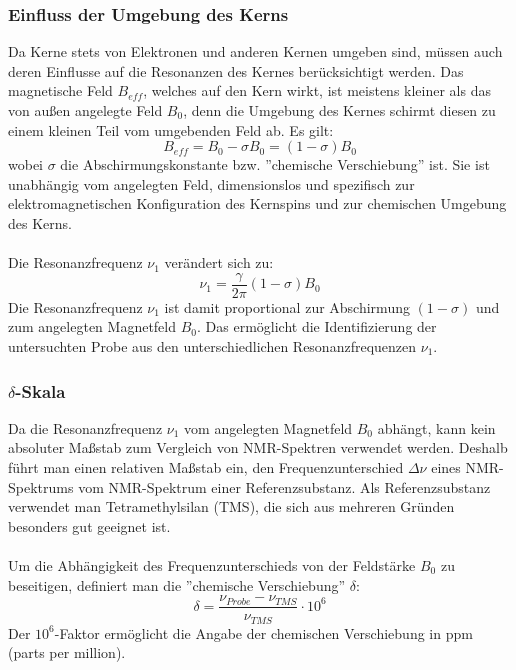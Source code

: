\documentclass[a4paper,titlepage]{scrartcl}
\numberwithin{equation}{section}
\begin{document}
\subsubsection{Einfluss der Umgebung des Kerns}
Da Kerne stets von Elektronen und anderen Kernen umgeben sind, müssen auch deren Einflusse auf die Resonanzen des Kernes berücksichtigt werden. Das magnetische Feld $B_{eff}$, welches auf den Kern wirkt, ist meistens kleiner als das von außen angelegte Feld $B_0$, denn die Umgebung des Kernes schirmt diesen zu einem kleinen Teil vom umgebenden Feld ab. Es gilt:
\begin{equation*}
B_{eff}=B_0-\sigma B_0=(1-\sigma)B_0
\end{equation*}
wobei $\sigma$ die Abschirmungskonstante bzw. ''chemische Verschiebung'' ist. Sie ist unabhängig vom angelegten Feld, dimensionslos und spezifisch zur elektromagnetischen Konfiguration des Kernspins und zur chemischen Umgebung des Kerns.\\ \\
Die Resonanzfrequenz $\nu_1$ verändert sich zu:
\begin{equation*}
\nu_1=\frac{\gamma}{2 \pi} (1 - \sigma) B_0
\end{equation*}
Die Resonanzfrequenz $\nu_1$ ist damit proportional zur Abschirmung $(1-\sigma)$ und zum angelegten Magnetfeld $B_0$. Das ermöglicht die Identifizierung der untersuchten Probe aus den unterschiedlichen Resonanzfrequenzen $\nu_1$.
\subsubsection{$\delta$-Skala}
Da die Resonanzfrequenz $\nu_1$ vom angelegten Magnetfeld $B_0$ abhängt, kann kein absoluter Maßstab zum Vergleich von NMR-Spektren verwendet werden. Deshalb führt man einen relativen Maßstab ein, den Frequenzunterschied $\Delta \nu$ eines NMR-Spektrums vom NMR-Spektrum einer Referenzsubstanz. Als Referenzsubstanz verwendet man Tetramethylsilan (TMS), die sich aus mehreren Gründen besonders gut geeignet ist.\\ \\
Um die Abhängigkeit des Frequenzunterschieds von der Feldstärke $B_0$ zu beseitigen, definiert man die ''chemische Verschiebung'' $\delta$:
\begin{equation}
\delta=\frac{\nu_{Probe}-\nu_{TMS}}{\nu_{TMS}} \cdot 10^6
\label{eq:deltaskala}
\end{equation}
Der $10^6$-Faktor ermöglicht die Angabe der chemischen Verschiebung in ppm (parts per million).
\end{document}
